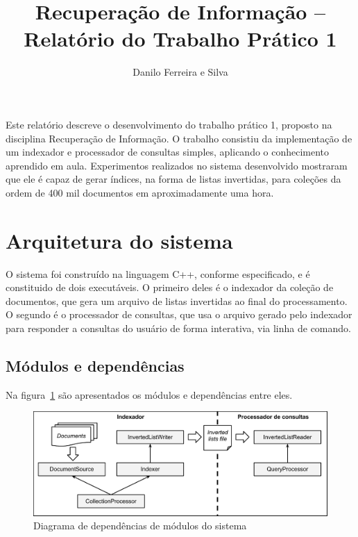 \documentclass[12pt]{article}
\title{Recuperação de Informação -- Relatório do Trabalho Prático 1}
\author{Danilo Ferreira e Silva\inst{1}}
\begin{document}
 

\maketitle

\begin{resumo}
  Este relatório descreve o desenvolvimento do trabalho prático 1, proposto na 
  disciplina Recuperação de Informação. O trabalho consistiu da implementação de um
  indexador e processador de consultas simples, aplicando o conhecimento aprendido em
  aula. Experimentos realizados no sistema desenvolvido mostraram que ele é capaz de gerar
  índices, na forma de listas invertidas, para coleções da ordem de 400 mil documentos
  em aproximadamente uma hora.
\end{resumo}


\section{Arquitetura do sistema} \label{sec:firstpage}

O sistema foi construído na linguagem C++, conforme especificado, e é constituido de 
dois executáveis. O primeiro deles é o indexador da coleção de documentos, que gera 
um arquivo de listas invertidas ao final do processamento.
O segundo é o processador de consultas, que usa o arquivo gerado pelo
indexador para responder a consultas do usuário de forma interativa, via linha de
comando.


\subsection{Módulos e dependências}

Na figura~\ref{fig:modules} são apresentados os módulos e dependências entre eles.

\begin{figure}[ht]
\centering
\includegraphics[width=1\textwidth]{modules.pdf}
\caption{Diagrama de dependências de módulos do sistema}
\label{fig:modules}
\end{figure}
\end{document}
